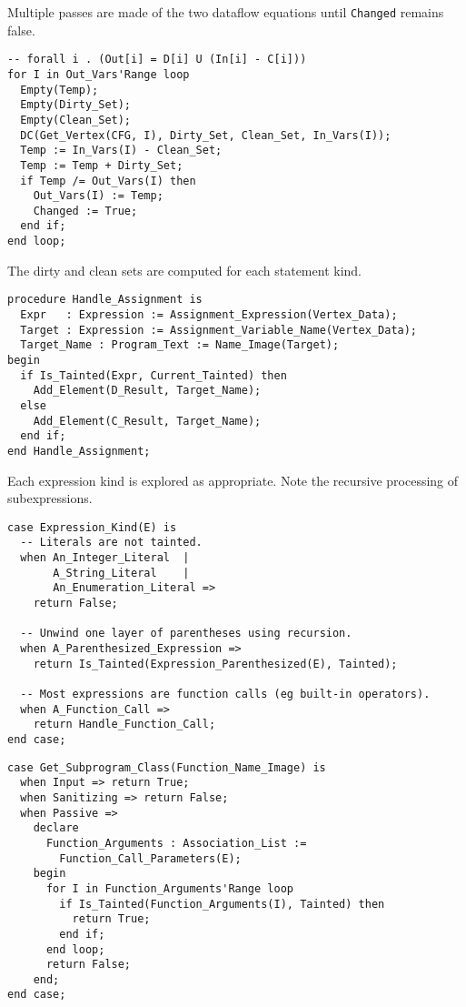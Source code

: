 \documentclass[landscape]{slides}
\begin{document}
Multiple passes are made of the two dataflow equations until \texttt{Changed} remains false.
\begin{verbatim}
-- forall i . (Out[i] = D[i] U (In[i] - C[i]))
for I in Out_Vars'Range loop
  Empty(Temp);
  Empty(Dirty_Set);
  Empty(Clean_Set);
  DC(Get_Vertex(CFG, I), Dirty_Set, Clean_Set, In_Vars(I));
  Temp := In_Vars(I) - Clean_Set;
  Temp := Temp + Dirty_Set;
  if Temp /= Out_Vars(I) then
    Out_Vars(I) := Temp;
    Changed := True;
  end if;
end loop;
\end{verbatim}
\stopslide

The dirty and clean sets are computed for each statement kind.
\begin{verbatim}
procedure Handle_Assignment is
  Expr   : Expression := Assignment_Expression(Vertex_Data);
  Target : Expression := Assignment_Variable_Name(Vertex_Data);
  Target_Name : Program_Text := Name_Image(Target);
begin
  if Is_Tainted(Expr, Current_Tainted) then
    Add_Element(D_Result, Target_Name);
  else
    Add_Element(C_Result, Target_Name);
  end if;
end Handle_Assignment;
\end{verbatim}
\stopslide

Each expression kind is explored as appropriate. Note the recursive processing of
subexpressions.
\begin{verbatim}
case Expression_Kind(E) is
  -- Literals are not tainted.
  when An_Integer_Literal  |
       A_String_Literal    |
       An_Enumeration_Literal =>
    return False;

  -- Unwind one layer of parentheses using recursion.
  when A_Parenthesized_Expression =>
    return Is_Tainted(Expression_Parenthesized(E), Tainted);

  -- Most expressions are function calls (eg built-in operators).
  when A_Function_Call =>
    return Handle_Function_Call;
end case;
\end{verbatim}
\stopslide

\begin{verbatim}
case Get_Subprogram_Class(Function_Name_Image) is
  when Input => return True;
  when Sanitizing => return False;
  when Passive =>
    declare
      Function_Arguments : Association_List :=
        Function_Call_Parameters(E);
    begin
      for I in Function_Arguments'Range loop
        if Is_Tainted(Function_Arguments(I), Tainted) then
          return True;
        end if;
      end loop;
      return False;
    end;
end case;
\end{verbatim}
\stopslide
\end{document}

